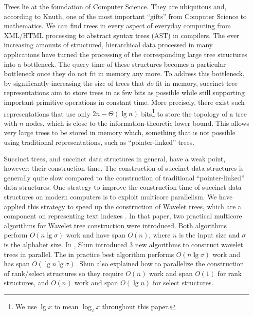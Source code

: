 Trees lie at the foundation of Computer Science. They are ubiquitous
and, according to Knuth, one of the most important ``gifts'' from
Computer Science to mathematics. We can find trees in every aspect of
everyday computing from XML/HTML processing to abstract syntax trees
(AST) in compilers.  The ever increasing amounts of structured,
hierarchical data processed in many applications have turned the
processing of the corresponding large tree structures into a
bottleneck.  The query time of these structures becomes a particular
bottleneck once they do not fit in memory any more.  To address this
bottleneck, by significantly increasing the size of trees that
\emph{do} fit in memory, succinct tree representations aim to store
trees in as few bits as possible while still supporting important
primitive operations in constant time.  More precisely, there exist
such representations that use only $2n - \Theta(\lg n)$
bits\footnote{We use $\lg x$ to mean $\log_{2}x$ throughout this
paper.} to store the topology of a tree with $n$ nodes, which is close
to the information-theoretic lower bound.  This allows very large
trees to be stored in memory which, something that is not possible
using traditional representations, such as ``pointer-linked'' trees.

Succinct trees, and succinct data structures in general, have a weak
point, however: their construction time. The construction of succinct
data structures is generally quite slow compared to the construction
of traditional ``pointer-linked'' data structures.  One strategy to
improve the construction time of succinct data structures on modern
computers is to exploit multicore parallelism.  We have applied this
strategy to speed up the construction of Wavelet trees, which are a
component on representing text indexes \cite{Fuentes2014}.  In that
paper, two practical multicore algorithms for Wavelet tree
construction were introduced. Both algorithms perform $O(n\lg \sigma)$
work and have span $O(n)$, where $n$ is the input size and $\sigma$ is
the alphabet size. In \cite{DBLP:journals/corr/Shun14}, Shun
introduced 3 new algorithms to construct wavelet trees in
parallel. The in practice best algorithm performs $O(n\lg \sigma)$
work and has span $O(\lg n\lg \sigma)$.  Shun also explained how to
parallelize the construction of rank/select structures so they require
$O(n)$ work and span $O(1)$ for rank structures, and $O(n)$ work and
span $O(\lg n)$ for select structures.

